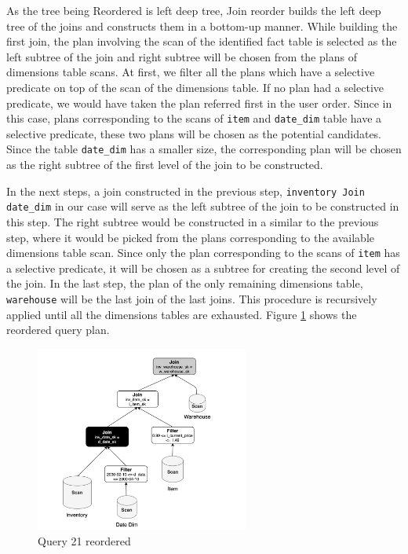 As the tree being Reordered is left deep tree, Join reorder builds the left deep tree of the joins and constructs them in a bottom-up manner. While building the first join, the plan involving the scan of the identified fact table is selected as the left subtree of the join and right subtree will be chosen from the plans of dimensions table scans. At first, we filter all the plans which have a selective predicate on top of the scan of the dimensions table. If no plan had a selective predicate, we would have taken the plan referred first in the user order. Since in this case, plans corresponding to the scans of \texttt{item} and \texttt{date\_dim} table have a selective predicate, these two plans will be chosen as the potential candidates. Since the table \texttt{date\_dim} has a smaller size, the corresponding plan will be chosen as the right subtree of the first level of the join to be constructed.

In the next steps, a join constructed in the previous step, \texttt{inventory Join date\_dim} in our case will serve as the left subtree of the join to be constructed in this step. The right subtree would be constructed in a similar to the previous step, where it would be picked from the plans corresponding to the available dimensions table scan. Since only the plan corresponding to the scans of \texttt{item} has a selective predicate, it will be chosen as a subtree for creating the second level of the join. In the last step, the plan of the only remaining dimensions table, \texttt{warehouse} will be the last join of the last joins. This procedure is recursively applied until all the dimensions tables are exhausted. Figure \ref{with-reorder} shows the reordered query plan.

\begin{figure}[ht]
\centerline{\includegraphics[width=7cm]{fig/with-reorder.png}}
\caption{Query 21 reordered}
\label{with-reorder}
\end{figure}